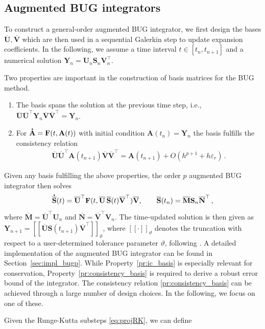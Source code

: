 \documentclass[preprint,runningheads]{svjour3}
\newcommand*{\dt}[1]{ \accentset{\mbox{\large\bfseries .}}{#1}}
\def\wt{\widetilde}
\def\wt{\overline}
\newcommand\bfA{{\mathbf A}}
\newcommand\bfF{{\mathbf F}}
\newcommand\bfM{{\mathbf M}}
\newcommand\bfN{{\mathbf N}}
\newcommand\bfS{{\mathbf S}}
\newcommand\bfU{{\mathbf U}}
\newcommand\bfV{{\mathbf V}}
\newcommand\bfY{{\mathbf Y}}
\begin{document}
\subsection{Augmented BUG integrators}\label{sec:BUG-p-intro} To construct a general-order augmented BUG integrator, we first design the bases $\wt \bfU, \wt \bfV$ which are then used in a sequential Galerkin step to update expansion coefficients. In the following, we assume a time interval $t\in[t_n,t_{n+1}]$ and a numerical solution $\bfY_n = \bfU_n\bfS_n\bfV_n^{\top}$. {Two properties are important in the construction of basis matrices for the BUG method. 
\begin{enumerate}[label=P\arabic*, ref=P\arabic*]
    \item The basis spans the solution at the previous time step, i.e., $\wt \bfU\wt \bfU^{\top} \bfY_n \wt \bfV\wt \bfV^{\top} = \bfY_n$. \label{pr:ic_basis}
    \item For $\dt\bfA = \bfF(t,\bfA(t))$ with initial condition $\bfA(t_n) = \bfY_n$ the basis fulfills the consistency relation \label{pr:consistency_basis}
\begin{align}\label{eq:consistency_relation}
    \wt \bfU\wt \bfU^{\top} \bfA(t_{n+1}) \wt \bfV\wt \bfV^{\top} = \bfA(t_{n+1}) + O(h^{p+1} + h\varepsilon_r)\,.
\end{align}
\end{enumerate}
Given any basis fulfilling the above properties, the order $p$ augmented BUG integrator then solves
		\begin{equation}\label{bar-S-step} 
		\dt{\wt\bfS}(t) =  \wt\bfU^\top \bfF(t, \wt\bfU \, \wt\bfS(t) \wt\bfV^\top) \wt\bfV, 
		\qquad \wt\bfS(t_n) = \wt\bfM \bfS_n \wt\bfN^\top\,,
		\end{equation}
where $\wt \bfM=\wt \bfU^\top \bfU_n$ and $\wt\bfN=\wt \bfV^\top \bfV_n$. The time-updated solution is then given as $\bfY_{n+1} = [\![ \wt \bfU\bfS(t_{n+1})\wt \bfV^{\top}]\!]_{\vartheta}$, where $[\![ \cdot]\!]_{\vartheta}$ denotes the truncation with respect to a user-determined tolerance parameter $\vartheta$, following \cite{ceruti2023rank}. A detailed implementation of the augmented BUG integrator can be found in Section~\ref{sec:impl_bugp}. While Property~\ref{pr:ic_basis} is especially relevant for conservation, Property~\ref{pr:consistency_basis} is required to derive a robust error bound of the integrator. The consistency relation \ref{pr:consistency_basis} can be achieved through a large number of design choices. In the following, we focus on one of these.
} 
Given the Runge-Kutta substeps \eqref{eq:projRK}, we can define
\end{document}
